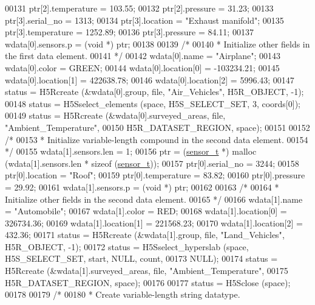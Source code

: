 \begin{DoxyCode}
00131     ptr[2].temperature = 103.55;
00132     ptr[2].pressure = 31.23;
00133     ptr[3].serial\_no = 1313;
00134     ptr[3].location = \textcolor{stringliteral}{"Exhaust manifold"};
00135     ptr[3].temperature = 1252.89;
00136     ptr[3].pressure = 84.11;
00137     wdata[0].sensors.p = (\textcolor{keywordtype}{void} *) ptr;
00138 
00139     \textcolor{comment}{/*}
00140 \textcolor{comment}{     * Initialize other fields in the first data element.}
00141 \textcolor{comment}{     */}
00142     wdata[0].name = \textcolor{stringliteral}{"Airplane"};
00143     wdata[0].color = GREEN;
00144     wdata[0].location[0] = -103234.21;
00145     wdata[0].location[1] = 422638.78;
00146     wdata[0].location[2] = 5996.43;
00147     status = H5Rcreate (&wdata[0].group, file, \textcolor{stringliteral}{"Air\_Vehicles"}, H5R\_OBJECT, -1);
00148     status = H5Sselect\_elements (space, H5S\_SELECT\_SET, 3, coords[0]);
00149     status = H5Rcreate (&wdata[0].surveyed\_areas, file, \textcolor{stringliteral}{"Ambient\_Temperature"},
00150                 H5R\_DATASET\_REGION, space);
00151 
00152     \textcolor{comment}{/*}
00153 \textcolor{comment}{     * Initialize variable-length compound in the second data element.}
00154 \textcolor{comment}{     */}
00155     wdata[1].sensors.len = 1;
00156     ptr = (\hyperlink{structsensor__t}{sensor\_t} *) malloc (wdata[1].sensors.len * sizeof (\hyperlink{structsensor__t}{sensor\_t}));
00157     ptr[0].serial\_no = 3244;
00158     ptr[0].location = \textcolor{stringliteral}{"Roof"};
00159     ptr[0].temperature = 83.82;
00160     ptr[0].pressure = 29.92;
00161     wdata[1].sensors.p = (\textcolor{keywordtype}{void} *) ptr;
00162 
00163     \textcolor{comment}{/*}
00164 \textcolor{comment}{     * Initialize other fields in the second data element.}
00165 \textcolor{comment}{     */}
00166     wdata[1].name = \textcolor{stringliteral}{"Automobile"};
00167     wdata[1].color = RED;
00168     wdata[1].location[0] = 326734.36;
00169     wdata[1].location[1] = 221568.23;
00170     wdata[1].location[2] = 432.36;
00171     status = H5Rcreate (&wdata[1].group, file, \textcolor{stringliteral}{"Land\_Vehicles"}, H5R\_OBJECT, -1);
00172     status = H5Sselect\_hyperslab (space, H5S\_SELECT\_SET, start, NULL, count,
00173                 NULL);
00174     status = H5Rcreate (&wdata[1].surveyed\_areas, file, \textcolor{stringliteral}{"Ambient\_Temperature"},
00175                 H5R\_DATASET\_REGION, space);
00176 
00177     status = H5Sclose (space);
00178 
00179     \textcolor{comment}{/*}
00180 \textcolor{comment}{     * Create variable-length string datatype.}

\end{DoxyCode}
